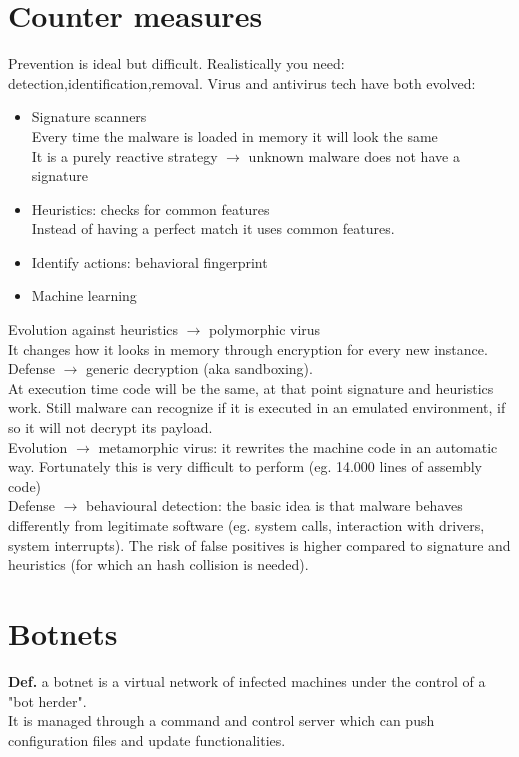 \documentclass[10pt,a4paper]{book}
\begin{document}
\section{Counter measures}
Prevention is ideal but difficult. Realistically you need: detection,identification,removal. Virus and antivirus tech have both evolved:
\begin{itemize}
\item Signature scanners\\
Every time the malware is loaded in memory it will look the same\\
It is a purely reactive strategy $\to$ unknown malware does not have a signature
\item Heuristics: checks for common features\\
Instead of having a perfect match it uses common features.
\item Identify actions: behavioral fingerprint
\item Machine learning
\end{itemize}
Evolution against heuristics $\to$ polymorphic virus\\
It changes how it looks in memory through encryption for every new instance.\\
Defense $\to$ generic decryption (aka sandboxing).\\
At execution time code will be the same, at that point signature and heuristics work. Still malware can recognize if it is executed in an emulated environment, if so it will not decrypt its payload.\\
Evolution $\to$ metamorphic virus: it rewrites the machine code in an automatic way. Fortunately this is very difficult to perform (eg. 14.000 lines of assembly code)\\
Defense $\to$ behavioural detection: the basic idea is that malware behaves differently from legitimate software (eg. system calls, interaction with drivers, system interrupts). The risk of false positives is higher compared to signature and heuristics (for which an hash collision is needed).
\newpage
\section{Botnets}
\textbf{Def.} a botnet is a virtual network of infected machines under the control of a "bot herder".\\
It is managed through a command and control server which can push configuration files and update functionalities.
\end{document}
